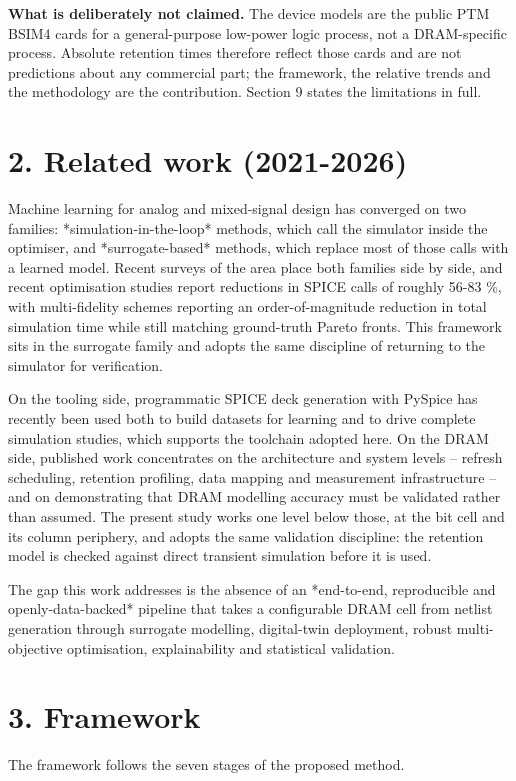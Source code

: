 \documentclass[conference]{IEEEtran}
\begin{document}
\textbf{What is deliberately not claimed.} The device models are the public PTM BSIM4
cards for a general-purpose low-power logic process, not a DRAM-specific process.
Absolute retention times therefore reflect those cards and are not predictions about
any commercial part; the framework, the relative trends and the methodology are the
contribution. Section 9 states the limitations in full.

\section{2. Related work (2021-2026)}
Machine learning for analog and mixed-signal design has converged on two families:
*simulation-in-the-loop* methods, which call the simulator inside the optimiser, and
*surrogate-based* methods, which replace most of those calls with a learned model.
Recent surveys of the area place both families side by side, and recent
optimisation studies report reductions in SPICE calls of roughly 56-83 \%, with
multi-fidelity schemes reporting an order-of-magnitude reduction in total
simulation time while still matching ground-truth Pareto fronts. This framework sits
in the surrogate family and adopts the same discipline of returning to the simulator
for verification.

On the tooling side, programmatic SPICE deck generation with PySpice has recently
been used both to build datasets for learning and to drive complete simulation
studies, which supports the toolchain adopted here. On the DRAM side, published work
concentrates on the architecture and system levels -- refresh scheduling, retention
profiling, data mapping and measurement infrastructure -- and on demonstrating that
DRAM modelling accuracy must be validated rather than assumed. The present study
works one level below those, at the bit cell and its column periphery, and adopts the
same validation discipline: the retention model is checked against direct transient
simulation before it is used.

The gap this work addresses is the absence of an *end-to-end, reproducible and
openly-data-backed* pipeline that takes a configurable DRAM cell from netlist
generation through surrogate modelling, digital-twin deployment, robust
multi-objective optimisation, explainability and statistical validation.



\section{3. Framework}
The framework follows the seven stages of the proposed method.
\end{document}
